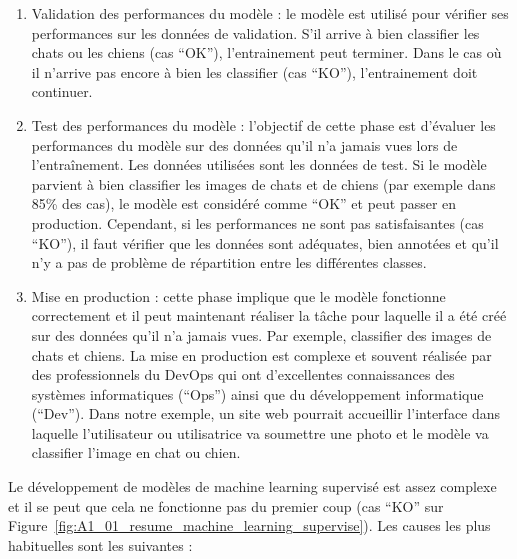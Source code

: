 \begin{enumerate}
    \item Validation des performances du modèle : le modèle est utilisé pour vérifier ses performances sur les données de validation. S'il arrive à bien classifier les chats ou les chiens (cas ``OK''), l'entrainement peut terminer. Dans le cas où il n'arrive pas encore à bien les classifier (cas ``KO''), l'entrainement doit continuer.
    
    \item Test des performances du modèle : l'objectif de cette phase est d'évaluer les performances du modèle sur des données qu'il n'a jamais vues lors de l'entraînement. Les données utilisées sont les données de test. Si le modèle parvient à bien classifier les images de chats et de chiens (par exemple dans 85\% des cas), le modèle est considéré comme ``OK'' et peut passer en production. Cependant, si les performances ne sont pas satisfaisantes (cas ``KO''), il faut vérifier que les données sont adéquates, bien annotées et qu'il n'y a pas de problème de répartition entre les différentes classes.
    
    \item Mise en production : cette phase implique que le modèle fonctionne correctement et il peut maintenant réaliser la tâche pour laquelle il a été créé sur des données qu'il n'a jamais vues. Par exemple, classifier des images de chats et chiens. La mise en production est complexe et souvent réalisée par des professionnels du DevOps qui ont d'excellentes connaissances des systèmes informatiques (``Ops'') ainsi que du développement informatique (``Dev''). Dans notre exemple, un site web pourrait accueillir l'interface dans laquelle l'utilisateur ou utilisatrice va soumettre une photo et le modèle va classifier l'image en chat ou chien.
\end{enumerate}

\par{Le développement de modèles de machine learning supervisé est assez complexe et il se peut que cela ne fonctionne pas du premier coup (cas ``KO'' sur Figure~\ref{fig:A1_01_resume_machine_learning_supervise}). Les causes les plus habituelles sont les suivantes :}

